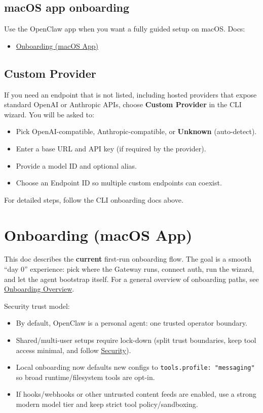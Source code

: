 \subsection{macOS app onboarding}


Use the OpenClaw app when you want a fully guided setup on macOS. Docs:

\begin{itemize}
  \item \href{/start/onboarding}{Onboarding (macOS App)}
\end{itemize}


\subsection{Custom Provider}


If you need an endpoint that is not listed, including hosted providers that
expose standard OpenAI or Anthropic APIs, choose \textbf{Custom Provider} in the
CLI wizard. You will be asked to:

\begin{itemize}
  \item Pick OpenAI-compatible, Anthropic-compatible, or \textbf{Unknown} (auto-detect).
  \item Enter a base URL and API key (if required by the provider).
  \item Provide a model ID and optional alias.
  \item Choose an Endpoint ID so multiple custom endpoints can coexist.
\end{itemize}


For detailed steps, follow the CLI onboarding docs above.


\clearpage

\section{Onboarding (macOS App)}


This doc describes the \textbf{current} first‑run onboarding flow. The goal is a
smooth “day 0” experience: pick where the Gateway runs, connect auth, run the
wizard, and let the agent bootstrap itself.
For a general overview of onboarding paths, see \href{/start/onboarding-overview}{Onboarding Overview}.


Security trust model:

\begin{itemize}
  \item By default, OpenClaw is a personal agent: one trusted operator boundary.
  \item Shared/multi-user setups require lock-down (split trust boundaries, keep tool access minimal, and follow \href{/gateway/security}{Security}).
  \item Local onboarding now defaults new configs to \texttt{tools.profile: "messaging"} so broad runtime/filesystem tools are opt-in.
  \item If hooks/webhooks or other untrusted content feeds are enabled, use a strong modern model tier and keep strict tool policy/sandboxing.
\end{itemize}



